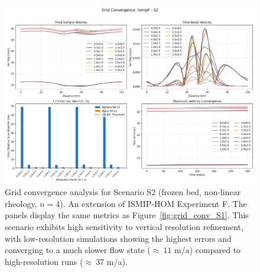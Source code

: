 \begin{figure}[H]
    \includegraphics[scale=0.40]{figures/IsmipF_S2_convergence_summary.png}
    \caption{Grid convergence analysis for Scenario S2 (frozen bed, non-linear rheology, $n=4$). An extension of ISMIP-HOM Experiment F. The panels display the same metrics as Figure~\ref{fig:grid_conv_S1}. This scenario exhibits high sensitivity to vertical resolution refinement, with low-resolution simulations showing the highest errors and converging to a much slower flow state ($\approx~11$ m/a) compared to high-resolution runs ($\approx~37$ m/a).}
    \label{fig:grid_conv_S2}
\end{figure}
